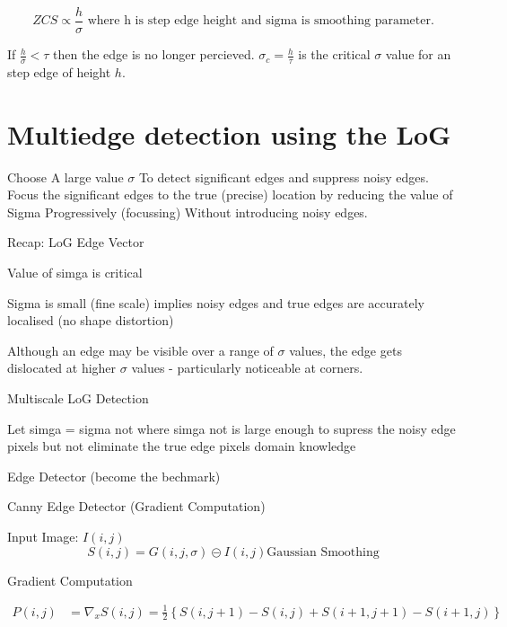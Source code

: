 \documentclass[11pt]{article}
\theoremstyle{definition}
\begin{document}
\[
ZCS \propto \frac{h}{\sigma} \text{ where h is step edge height and sigma is smoothing parameter.}
\]

If $\frac{h}{\sigma} < \tau$ then the edge is no longer percieved.
$\sigma_c = \frac{h}{\tau}$ is the critical $\sigma$ value for an step edge of height $h$.

\section{Multiedge detection using the LoG}

Choose A large value $\sigma$ To detect significant edges and suppress noisy edges.
Focus the significant edges to the true (precise) location by reducing the value of Sigma Progressively (focussing) Without introducing noisy edges.

\newpage
\pagestyle{fancy}  %

Recap: LoG Edge Vector

Value of simga is critical

Sigma is small (fine scale) implies noisy edges and true edges are accurately localised (no shape distortion)


Although an edge may be visible over a range of $\sigma$ values, the edge gets dislocated at higher $\sigma$ values - particularly noticeable at corners.



Multiscale LoG Detection 



Let simga = sigma not where simga not is large enough to supress the noisy edge pixels but not eliminate the true edge pixels domain knowledge 

\newpage
\pagestyle{fancy}  %

Edge Detector (become the bechmark)

Canny Edge Detector (Gradient Computation)

Input Image: $I(i, j)$
\[
S(i,j) = G(i, j, \sigma) \circleddash I(i, j) \text{Gaussian Smoothing}
\]

Gradient Computation

\begin{equation}
    \begin{aligned}
        P(i, j) &= \nabla_x S(i,j) = \frac{1}{2}\left\{S(i, j+1)- S(i, j) + S(i+1, j+1)- S(i+1, j)\right\} 
    \end{aligned}
\end{equation}
\end{document}
